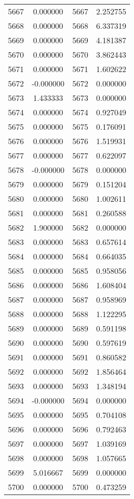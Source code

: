 \documentclass[12pt]{article}
\begin{document}
\begin{longtable}{@{}cccc@{}}
5667 & 0.000000 & 5667 & 2.252755 \\
5668 & 0.000000 & 5668 & 6.337319 \\
5669 & 0.000000 & 5669 & 4.181387 \\
5670 & 0.000000 & 5670 & 3.862443 \\
5671 & 0.000000 & 5671 & 1.602622 \\
5672 & -0.000000 & 5672 & 0.000000 \\
5673 & 1.433333 & 5673 & 0.000000 \\
5674 & 0.000000 & 5674 & 0.927049 \\
5675 & 0.000000 & 5675 & 0.176091 \\
5676 & 0.000000 & 5676 & 1.519931 \\
5677 & 0.000000 & 5677 & 0.622097 \\
5678 & -0.000000 & 5678 & 0.000000 \\
5679 & 0.000000 & 5679 & 0.151204 \\
5680 & 0.000000 & 5680 & 1.002611 \\
5681 & 0.000000 & 5681 & 0.260588 \\
5682 & 1.900000 & 5682 & 0.000000 \\
5683 & 0.000000 & 5683 & 0.657614 \\
5684 & 0.000000 & 5684 & 0.664035 \\
5685 & 0.000000 & 5685 & 0.958056 \\
5686 & 0.000000 & 5686 & 1.608404 \\
5687 & 0.000000 & 5687 & 0.958969 \\
5688 & 0.000000 & 5688 & 1.122295 \\
5689 & 0.000000 & 5689 & 0.591198 \\
5690 & 0.000000 & 5690 & 0.597619 \\
5691 & 0.000000 & 5691 & 0.860582 \\
5692 & 0.000000 & 5692 & 1.856464 \\
5693 & 0.000000 & 5693 & 1.348194 \\
5694 & -0.000000 & 5694 & 0.000000 \\
5695 & 0.000000 & 5695 & 0.704108 \\
5696 & 0.000000 & 5696 & 0.792463 \\
5697 & 0.000000 & 5697 & 1.039169 \\
5698 & 0.000000 & 5698 & 1.057665 \\
5699 & 5.016667 & 5699 & 0.000000 \\
5700 & 0.000000 & 5700 & 0.473259 \\

\end{longtable}
\end{document}
